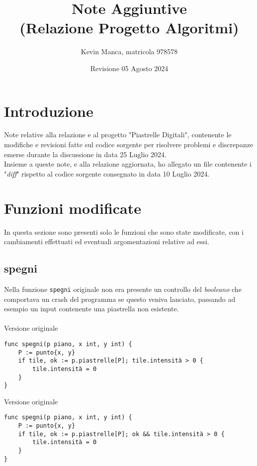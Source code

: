 \documentclass{article}
\title{Note Aggiuntive\\ (Relazione Progetto Algoritmi)}
\author{Kevin Manca, matricola 978578}
\date{Revisione 05 Agosto 2024}
\begin{document}
\maketitle
\tableofcontents

\section{Introduzione}\label{sec:intro}
Note relative alla relazione e al progetto "Piastrelle Digitali", contenente le modifiche e revisioni fatte sul codice sorgente per risolvere problemi e discrepanze emerse durante la discussione in data 25 Luglio 2024.
\\
Insieme a queste note, e alla relazione aggiornata, ho allegato un file contenente i "\textit{diff}" rispetto al codice sorgente consegnato in data 10 Luglio 2024.

\section{Funzioni modificate}\label{sec:funcs}
In questa sezione sono presenti solo le funzioni che sono state modificate, con i cambiamenti effettuati ed eventuali argomentazioni relative ad essi.

\subsection{spegni}
Nella funzione \texttt{spegni} originale non era presente un controllo del \textit{booleano} che comportava un crash del programma se questo veniva lanciato, passando ad esempio un input contenente una piastrella non esistente.
\\ \\
Versione originale
\begin{verbatim}
func spegni(p piano, x int, y int) {
	P := punto{x, y}
	if tile, ok := p.piastrelle[P]; tile.intensità > 0 {
		tile.intensità = 0
	}
}
\end{verbatim}
Versione originale
\begin{verbatim}
func spegni(p piano, x int, y int) {
	P := punto{x, y}
	if tile, ok := p.piastrelle[P]; ok && tile.intensità > 0 {
		tile.intensità = 0
	}
}
\end{verbatim}
\end{document}
